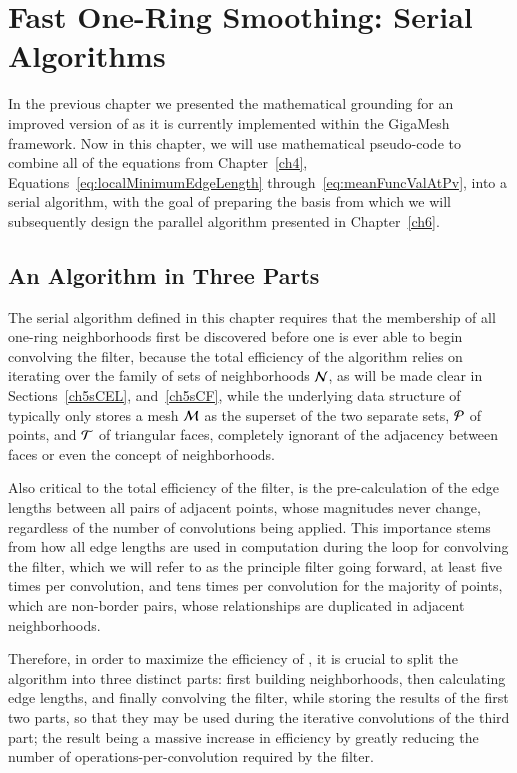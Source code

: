 \chapter{Fast One-Ring Smoothing: Serial Algorithms}
\label{ch5}
In the previous chapter we presented the mathematical grounding for an improved version of  as it is currently implemented within the GigaMesh framework. Now in this chapter, we will use mathematical pseudo-code to combine all of the equations from Chapter~\ref{ch4}, Equations~\ref{eq:localMinimumEdgeLength} through~\ref{eq:meanFuncValAtPv}, into a serial algorithm, with the goal of preparing the basis from which we will subsequently design the parallel algorithm presented in Chapter~\ref{ch6}.

%
%
%
%
\section{An Algorithm in Three Parts}
\label{ch5sATP}
The serial algorithm defined in this chapter requires that the membership of all one-ring neighborhoods first be discovered before one is ever able to begin convolving the filter, because the total efficiency of the algorithm relies on iterating over the family of sets of neighborhoods $\mathcal{N}$, as will be made clear in Sections~\ref{ch5sCEL}, and~\ref{ch5sCF}, while the underlying data structure of \tdd{} typically only stores a mesh $\mathcal{M}$ as the superset of the two separate sets, $\mathcal{P}$ of points, and $\mathcal{T}$ of triangular faces, completely ignorant of the adjacency between faces or even the concept of neighborhoods.

Also critical to the total efficiency of the filter, is the pre-calculation of the edge lengths between all pairs of adjacent points, whose magnitudes never change, regardless of the number of convolutions being applied. This importance stems from how all edge lengths are used in computation during the loop for convolving the filter, which we will refer to as the principle filter going forward, at least five times per convolution, and tens times per convolution for the majority of points, which are non-border pairs, whose relationships are duplicated in adjacent neighborhoods.%
%

Therefore, in order to maximize the efficiency of , it is crucial to split the algorithm into three distinct parts: first building neighborhoods, then calculating edge lengths, and finally convolving the filter, while storing the results of the first two parts, so that they may be used during the iterative convolutions of the third part; the result being a massive increase in efficiency by greatly reducing the number of operations-per-convolution required by the filter.

